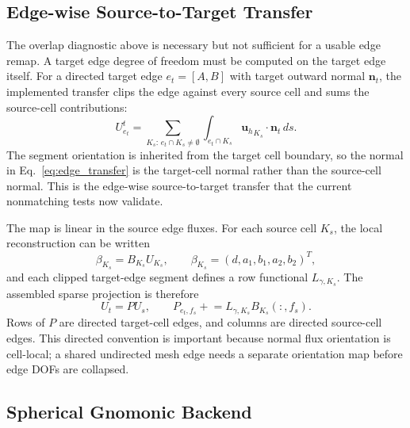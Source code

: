 \documentclass[11pt]{article}
\newcommand{\uh}{\mathbf{u}_h}
\newcommand{\n}{\mathbf{n}}
\begin{document}
\subsection{Edge-wise Source-to-Target Transfer}

The overlap diagnostic above is necessary but not sufficient for a usable edge
remap.  A target edge degree of freedom must be computed on the target edge
itself.  For a directed target edge \(e_t=[A,B]\) with target outward normal
\(\n_t\), the implemented transfer clips the edge against every source cell and
sums the source-cell contributions:
\begin{equation}
  U^t_{e_t}
  =
  \sum_{K_s:\, e_t\cap K_s\neq\emptyset}
  \int_{e_t\cap K_s} {\uh}_{K_s}\cdot\n_t\,ds .
  \label{eq:edge_transfer}
\end{equation}
The segment orientation is inherited from the target cell boundary, so the
normal in Eq.~\eqref{eq:edge_transfer} is the target-cell normal rather than the
source-cell normal.  This is the edge-wise source-to-target transfer that the
current nonmatching tests now validate.

The map is linear in the source edge fluxes.  For each source cell \(K_s\), the
local reconstruction can be written
\begin{equation}
  \beta_{K_s}=B_{K_s}U_{K_s},
  \qquad
  \beta_{K_s}=(d,a_1,b_1,a_2,b_2)^T,
  \label{eq:local_reconstruction_matrix}
\end{equation}
and each clipped target-edge segment defines a row functional
\(L_{\gamma,K_s}\).  The assembled sparse projection is therefore
\begin{equation}
  U_t = P U_s,\qquad
  P_{e_t,f_s} \mathrel{+}=
  L_{\gamma,K_s} B_{K_s}(:,f_s).
  \label{eq:sparse_projection}
\end{equation}
Rows of \(P\) are directed target-cell edges, and columns are directed
source-cell edges.  This directed convention is important because normal flux
orientation is cell-local; a shared undirected mesh edge needs a separate
orientation map before edge DOFs are collapsed.

\subsection{Spherical Gnomonic Backend}
\end{document}
